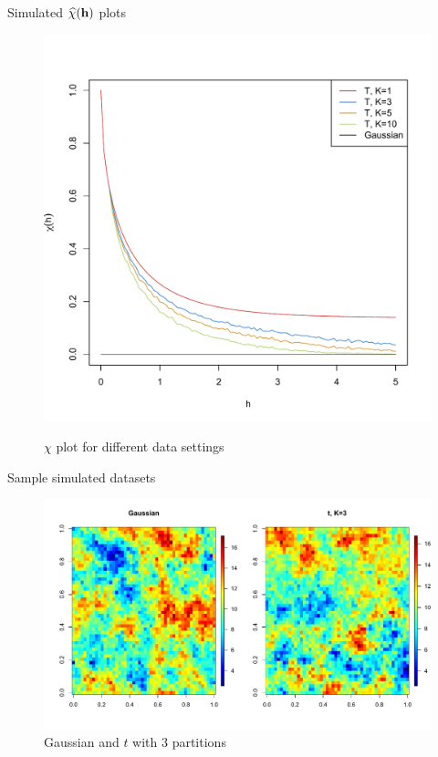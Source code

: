 \documentclass{beamer}
\begin{document}
\begin{frame}{Simulated $\widehat{\chi}(\mbox{\bf h})$ plots}
  \centering
  \begin{figure}
  \includegraphics[width=1\linewidth]{./plots/pot/chi-h.pdf}\\[-0.25in]
  \caption{$\chi$ plot for different data settings}
  \end{figure}
\end{frame}

\begin{frame}{Sample simulated datasets}
  \centering
  \begin{figure}
  \includegraphics[width=1\linewidth]{./plots/pot/gauss-vs-t3.pdf}
  \caption{Gaussian and $t$ with 3 partitions}
  \end{figure}
\end{frame}
\end{document}
